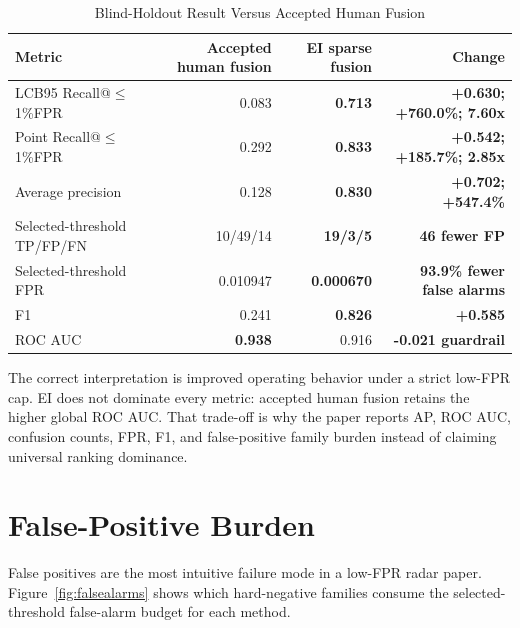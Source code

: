 \documentclass[10pt,journal]{IEEEtran}
\makeatletter
\newcommand{\kpigain}[1]{\textbf{\textcolor{EchoGain}{#1}}}
\newcommand{\kpicaveat}[1]{\textbf{\textcolor{EchoWarn}{#1}}}
\newcommand{\PrimaryKPI}{LCB95 Recall@$\leq$1\%FPR}
\newcommand{\PointKPI}{Recall@$\leq$1\%FPR}
\newcommand{\MetricPriorLcb}{0.083}
\newcommand{\MetricEiLcb}{0.713}
\newcommand{\MetricLcbAbsChange}{+0.630}
\newcommand{\MetricLcbRelativePercent}{+760.0\%}
\newcommand{\MetricLcbMultiplier}{7.60x}
\newcommand{\MetricPriorPointRecall}{0.292}
\newcommand{\MetricEiPointRecall}{0.833}
\newcommand{\MetricPointRecallAbsChange}{+0.542}
\newcommand{\MetricPointRecallRelativePercent}{+185.7\%}
\newcommand{\MetricPointRecallMultiplier}{2.85x}
\newcommand{\MetricPriorAP}{0.128}
\newcommand{\MetricEiAP}{0.830}
\newcommand{\MetricAPAbsChange}{+0.702}
\newcommand{\MetricAPRelativePercent}{+547.4\%}
\newcommand{\MetricPriorFOne}{0.241}
\newcommand{\MetricEiFOne}{0.826}
\newcommand{\MetricFOneAbsChange}{+0.585}
\newcommand{\MetricSelectedFPReduction}{46}
\newcommand{\MetricSelectedFPReductionPercent}{93.9\%}
\newcommand{\MetricPriorRocAuc}{0.938}
\newcommand{\MetricEiRocAuc}{0.916}
\newcommand{\MetricRocAucDelta}{-0.021}
\newcommand{\MetricPriorTPFPFN}{10/49/14}
\newcommand{\MetricEiTPFPFN}{19/3/5}
\newcommand{\MetricPriorSelectedFPR}{0.010947}
\newcommand{\MetricEiSelectedFPR}{0.000670}
\makeatother
\begin{document}
\begin{table}[t]
  \caption{Blind-Holdout Result Versus Accepted Human Fusion}
  \label{tab:mainresults}
  \centering
  \small
  \begin{tabular}{@{}lrrr@{}}
    \toprule
    Metric & Accepted human fusion & EI sparse fusion & Change \\
    \midrule
    \PrimaryKPI{} & \MetricPriorLcb{} & \kpigain{\MetricEiLcb{}} & \kpigain{\MetricLcbAbsChange{}; \MetricLcbRelativePercent{}; \MetricLcbMultiplier{}} \\
    Point \PointKPI{} & \MetricPriorPointRecall{} & \kpigain{\MetricEiPointRecall{}} & \kpigain{\MetricPointRecallAbsChange{}; \MetricPointRecallRelativePercent{}; \MetricPointRecallMultiplier{}} \\
    Average precision & \MetricPriorAP{} & \kpigain{\MetricEiAP{}} & \kpigain{\MetricAPAbsChange{}; \MetricAPRelativePercent{}} \\
    Selected-threshold TP/FP/FN & \MetricPriorTPFPFN{} & \kpigain{\MetricEiTPFPFN{}} & \kpigain{\MetricSelectedFPReduction{} fewer FP} \\
    Selected-threshold FPR & \MetricPriorSelectedFPR{} & \kpigain{\MetricEiSelectedFPR{}} & \kpigain{\MetricSelectedFPReductionPercent{} fewer false alarms} \\
    F1 & \MetricPriorFOne{} & \kpigain{\MetricEiFOne{}} & \kpigain{\MetricFOneAbsChange{}} \\
    ROC AUC & \kpicaveat{\MetricPriorRocAuc{}} & \MetricEiRocAuc{} & \kpicaveat{\MetricRocAucDelta{} guardrail} \\
    \bottomrule
  \end{tabular}
\end{table}

The correct interpretation is improved operating behavior under a strict low-FPR cap. EI does not dominate every metric: accepted human fusion retains the higher global ROC AUC. That trade-off is why the paper reports AP, ROC AUC, confusion counts, FPR, F1, and false-positive family burden instead of claiming universal ranking dominance.

\section{False-Positive Burden}
False positives are the most intuitive failure mode in a low-FPR radar paper. Figure~\ref{fig:falsealarms} shows which hard-negative families consume the selected-threshold false-alarm budget for each method.
\end{document}
